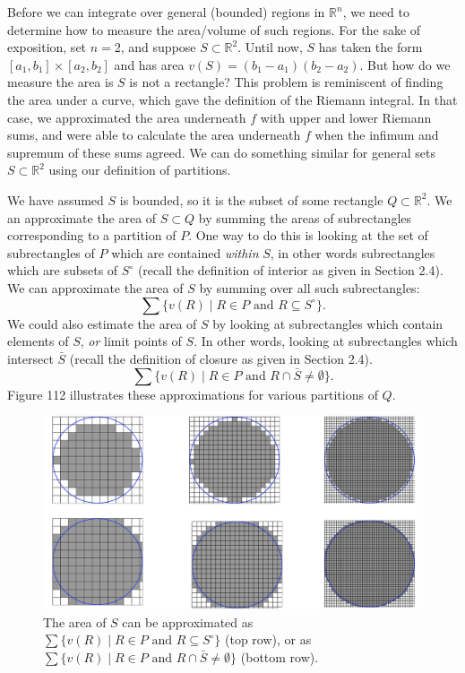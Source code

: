 \documentclass{article}
\newcommand{\R}{\mathbb{R}}
\theoremstyle{definition}
\begin{document}
	Before we can integrate over general (bounded) regions in $ \R^n $, we need to determine how to measure the area/volume of such regions. For the sake of exposition, set $ n=2 $, and suppose $ S \subset \R^2 $. Until now, $ S $ has taken the form $ [a_1,b_1]\times [a_2,b_2] $ and has area $ v(S)=(b_1-a_1)(b_2-a_2) $. But how do we measure the area is $ S $ is not a rectangle? This problem is reminiscent of finding the area under a curve, which gave the definition of the Riemann integral. In that case, we approximated the area underneath $ f $ with upper and lower Riemann sums, and were able to calculate the area underneath $ f $ when the infimum and supremum of these sums agreed. We can do something similar for general sets $ S\subset\R^2 $ using our definition of partitions.
	
	We have assumed $ S $ is bounded, so it is the subset of some rectangle $ Q\subset\R^2 $. We an approximate the area of $ S\subset Q $ by summing the areas of subrectangles corresponding to a partition of $ P $.  One way to do this is looking at the set of subrectangles  of $ P $ which are contained \textit{within} $ S $, in other words subrectangles which are subsets of $ S^\circ $ (recall the definition of interior as given in Section 2.4). We can approximate the area of $ S $ by summing over all such subrectangles:
	$$ \sum\{v(R)\mid R\in P\text{ and }R\subseteq S^\circ\}.$$ 
	We could also estimate the area of $ S $ by looking at subrectangles which contain elements of $ S $, \textit{or} limit points of $ S $. In other words, looking at subrectangles which intersect $ \bar S $ (recall the definition of closure as given in Section 2.4).
	$$ \sum\{v(R)\mid R\in P\text{ and }R\cap \bar S\neq \emptyset\}.$$ Figure 112 illustrates these approximations for various partitions of $ Q $.
	\begin{figure}[h!]
		\centering
		\includegraphics[width=1\linewidth]{figures/jordan_content}
		\caption{The area of $ S $ can be approximated as $ \sum\{v(R)\mid R\in P\text{ and }R\subseteq S^\circ\}$ (top row), or as $ \sum\{v(R)\mid R\in P\text{ and }R\cap \bar S\neq \emptyset\}$ (bottom row). }
		\label{fig:jordancontent}
	\end{figure}
	
\end{document}
